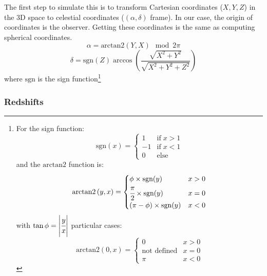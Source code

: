 The first step to simulate this is to transform Cartesian coordinates ($X, Y,
Z$) in the 3D space to celestial coordinates ($(\alpha,\delta)$ frame). In our
case, the origin of coordinates is the observer. Getting these coordinates is
the same as computing spherical coordinates.
%
\begin{equation}
    \alpha=\mbox{arctan2} \left(Y, X\right) \mod 2\pi
    \nonumber%
\end{equation}
%
\begin{equation}
    \delta=\mbox{sgn} \left(Z\right)
    \arccos\left(\frac{\sqrt{X^2+Y^2}}{\sqrt{X^2+Y^2+Z^2}}\right)
\end{equation}
%
where $\mbox{sgn}$ is the sign function\footnote{For the sign function:
    \begin{equation}
        \mbox{sgn}(x)= \begin{cases}
            1 &\mbox{if} \; x > 1 \\
            -1 &\mbox{if} \; x < 1 \\
            0 &\mbox{else}
        \end{cases}
    \end{equation}
%
and the $\mbox{arctan2}$ function is:
%
    \begin{equation}
        \mbox{arctan2} \left(y, x\right) = \begin{cases}
            \phi \times\mbox{sgn}(y) & x > 0 \\
            \cfrac{\pi}{2} \times\mbox{sgn}(y) & x = 0 \\
            \left(\pi - \phi\right) \times\mbox{sgn}(y) & x < 0
        \end{cases}
    \end{equation}
%
with $\tan\phi = \left|\cfrac{y}{x}\right|$ particular cases:
%
    \begin{equation}
        \mbox{arctan2} \left(0, x\right) = \begin{cases}
            0 & x > 0 \\
            \mbox{not defined} & x = 0 \\
            \pi & x < 0
        \end{cases}
    \end{equation}
}

\subsubsection{Redshifts}


